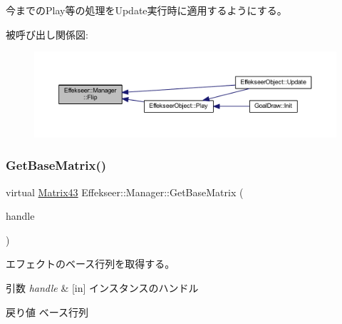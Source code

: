 今までの\+Play等の処理を\+Update実行時に適用するようにする。 

被呼び出し関係図\+:\nopagebreak
\begin{figure}[H]
\begin{center}
\leavevmode
\includegraphics[width=350pt]{class_effekseer_1_1_manager_ab810f714df5d12c566664183f365cbf4_icgraph}
\end{center}
\end{figure}
\mbox{\label{class_effekseer_1_1_manager_a095085007e1df5de623fea1a96c31a04}} 
\subsubsection{\texorpdfstring{Get\+Base\+Matrix()}{GetBaseMatrix()}}
{\footnotesize\ttfamily virtual \mbox{\hyperlink{struct_effekseer_1_1_matrix43}{Matrix43}} Effekseer\+::\+Manager\+::\+Get\+Base\+Matrix (\begin{DoxyParamCaption}\item[{\mbox{\hyperlink{namespace_effekseer_afba58b8d812da862190e9bbfc040824a}{Handle}}}]{handle }\end{DoxyParamCaption})\hspace{0.3cm}{\ttfamily [pure virtual]}}



エフェクトのベース行列を取得する。 


\begin{DoxyParams}{引数}
{\em handle} & \mbox{[}in\mbox{]} インスタンスのハンドル \\
\hline
\end{DoxyParams}
\begin{DoxyReturn}{戻り値}
ベース行列 
\end{DoxyReturn}
\mbox{\label{class_effekseer_1_1_manager_a10a79ead8392a39a9f43e771c7de067c}} 
